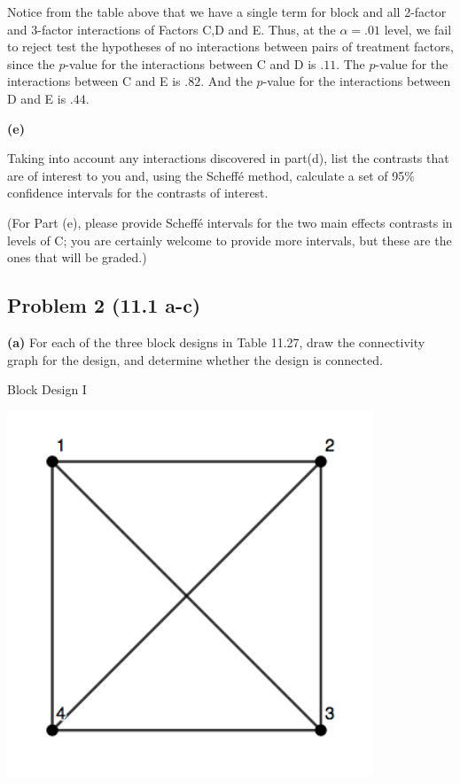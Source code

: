 \documentclass[12pt,]{article}
\begin{document}
Notice from the table above that we have a single term for block and all
2-factor and 3-factor interactions of Factors C,D and E. Thus, at the
\(\alpha = .01\) level, we fail to reject test the hypotheses of no
interactions between pairs of treatment factors, since the \(p\)-value
for the interactions between C and D is \(.11\). The \(p\)-value for the
interactions between C and E is \(.82\). And the \(p\)-value for the
interactions between D and E is \(.44\).

\textbf{(e)}

Taking into account any interactions discovered in part(d), list the
contrasts that are of interest to you and, using the Scheffé method,
calculate a set of 95\% confidence intervals for the contrasts of
interest.

(For Part (e), please provide Scheffé intervals for the two main effects
contrasts in levels of C; you are certainly welcome to provide more
intervals, but these are the ones that will be graded.)

\subsection{Problem 2 (11.1 a-c)}\label{problem-2-11.1-a-c}

\textbf{(a)} For each of the three block designs in Table 11.27, draw
the connectivity graph for the design, and determine whether the design
is connected.

\begin{center}
Block Design I
\end{center}

\begin{center}\includegraphics{Markdown_HW_8_files/figure-latex/unnamed-chunk-7-1} \end{center}
\end{document}

